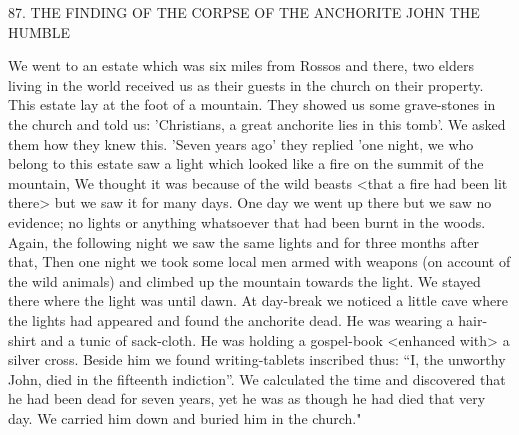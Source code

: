 87.
THE FINDING OF THE CORPSE OF
THE ANCHORITE JOHN THE HUMBLE

We went to an estate which was six miles from Rossos and there,
two elders living in the world received us as their guests in the
church on their property.
This estate lay at the foot of a mountain.
They showed us some grave-stones in the church and told us:
'Christians, a great anchorite lies in this tomb'.
We asked them how
they knew this.
'Seven years ago' they replied 'one night, we who
belong to this estate saw a light which looked like a fire on the
summit of the mountain, We thought it was because of the wild
beasts <that a fire had been lit there> but we saw it for many days.
One day we went up there but we saw no evidence; no lights or
anything whatsoever that had been burnt in the woods.
Again, the
following night we saw the same lights and for three months after
that, Then one night we took some local men armed with weapons
(on account of the wild animals) and climbed up the mountain
towards the light.
We stayed there where the light was until dawn.
At day-break we noticed a little cave where the lights had appeared
and found the anchorite dead.
He was wearing a hair-shirt and a
tunic of sack-cloth.
He was holding a gospel-book <enhanced with>
a silver cross.
Beside him we found writing-tablets inscribed thus: “I,
the unworthy John, died in the fifteenth indiction”.
We calculated
the time and discovered that he had been dead for seven years, yet
he was as though he had died that very day.
We carried him down
and buried him in the church."


